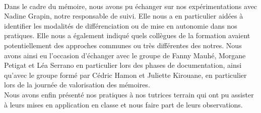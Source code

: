 \paragraph*{}
Dans le cadre du mémoire, nous avons pu échanger sur nos expérimentations avec Nadine Grapin, notre responsable de suivi. Elle nous a en particulier aidées à identifier les modalités de différenciation ou de mise en autonomie dans nos pratiques. Elle nous a également indiqué quels collègues de la formation avaient potentiellement des approches communes ou très différentes des notres. Nous avons ainsi eu l'occasion d'échanger avec le groupe de Fanny Mauhé, Morgane Petigat et Léa Serrano\cite{memoire_fanny} en particulier lors des phases de documentation, ainsi qu'avec le groupe formé par Cédric Hamon et Juliette Kirouane\cite{memoire_eval_differenciee}, en particulier lors de la journée de valorisation des mémoires.\\
Nous avons enfin présenté nos pratiques à nos tutrices terrain qui ont pu assister à leurs mises en application en classe et nous faire part de leurs observations.
